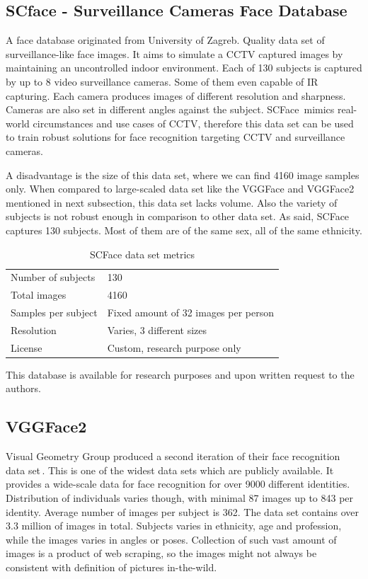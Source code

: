 \subsection{SCface - Surveillance Cameras Face Database}

A face database originated from University of Zagreb. Quality data set of surveillance-like face images. It aims to simulate a CCTV captured images by maintaining an uncontrolled indoor environment. Each of 130 subjects is captured by up to 8 video surveillance cameras. Some of them even capable of IR capturing. Each camera produces images of different resolution and sharpness. Cameras are also set in different angles against the subject. SCFace\,\cite{scface} mimics real-world circumstances and use cases of CCTV, therefore this data set can be used to train robust solutions for face recognition targeting CCTV and surveillance cameras.

A disadvantage is the size of this data set, where we can find \num{4160} image samples only. When compared to large-scaled data set like the VGGFace and VGGFace2 mentioned in next subsection, this data set lacks volume. Also the variety of subjects is not robust enough in comparison to other data set. As said, SCFace captures 130 subjects. Most of them are of the same sex, all of the same ethnicity.

\begin{table}[ht]
    \centering
    \begin{tabularx}{.8\textwidth}{l|X}
        \toprule
        Number of subjects & 130 \\
        Total images & \num{4160} \\
        Samples per subject & Fixed amount of 32 images per person \\
        Resolution & Varies, 3 different sizes \\
        License & Custom, research purpose only \\
        \bottomrule
    \end{tabularx}
    \caption{SCFace data set metrics}
\end{table}

This database is available for research purposes and upon written request to the authors.

\subsection{VGGFace2}

Visual Geometry Group produced a second iteration of their face recognition data set\,\cite{VVGFace2}. This is one of the widest data sets which are publicly available. It provides a wide-scale data for face recognition for over 9000 different identities. Distribution of individuals varies though, with minimal 87 images up to 843 per identity. Average number of images per subject is 362. The data set contains over \num{3.3} million of images in total. Subjects varies in ethnicity, age and profession, while the images varies in angles or poses. Collection of such vast amount of images is a product of web scraping, so the images might not always be consistent with definition of pictures in-the-wild.

